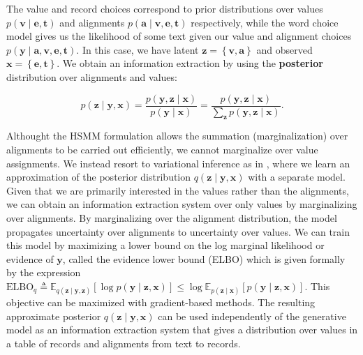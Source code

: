 \documentclass[11pt]{article}
\newcommand\set[1]{\left\{#1\right\}}
\newcommand\Es[2]{\mathbb{E}_{#1}\left[#2\right]}
\newcommand{\ba}{\mathbf{a}}
\newcommand{\be}{\mathbf{e}}
\newcommand{\bt}{\mathbf{t}}
\newcommand{\bv}{\mathbf{v}}
\newcommand{\bx}{\mathbf{x}}
\newcommand{\by}{\mathbf{y}}
\newcommand{\bz}{\mathbf{z}}
\begin{document}
The value and record choices correspond to prior distributions over values $p(\bv\mid\be,\bt)$
and alignments $p(\ba\mid\bv,\be,\bt)$ respectively,
while the word choice model gives us the likelihood of some text given our value and alignment choices $p(\by\mid\ba,\bv,\be,\bt)$.
In this case, we have latent $\bz = \set{\bv,\ba}$ and observed $\bx = \set{\be,\bt}$.
We obtain an information extraction by using the 
\textbf{posterior} distribution over alignments and values:
\begin{linenomath*}
$$
p(\bz\mid\by,\bx)=\frac{p(\by,\bz\mid\bx)}{p(\by\mid\bx)}=\frac{p(\by,\bz\mid\bx)}{\sum_\bz p(\by,\bz\mid\bx)}.
$$
\end{linenomath*}
Althought the HSMM formulation allows the summation (marginalization) over alignments to be carried out efficiently,
we cannot marginalize over value assignments.
We instead resort to variational inference as in \citet{deng2018attn},
where we learn an approximation of the posterior distribution $q(\bz\mid\by,\bx)$
with a separate model.
Given that we are primarily interested in the values rather than the alignments,
we can obtain an information extraction system over only values by marginalizing over alignments.
By marginalizing over the alignment distribution, the model propagates uncertainty over alignments
to uncertainty over values.
We can train this model by maximizing a lower bound on the log marginal likelihood or evidence of $\by$,
called the evidence lower bound (ELBO) which is given formally by the expression
$\textrm{ELBO}_q \triangleq \Es{q(\bz\mid\by,\bz)}{\log p(\by\mid\bz,\bx)}\leq \log \Es{p(\bz\mid\bx)} {p(\by\mid\bz,\bx)}$.
This objective can be maximized with gradient-based methods.
The resulting approximate posterior $q(\bz\mid\by,\bx)$ can be used independently of the 
generative model as an information extraction system that gives a distribution over
values in a table of records and alignments from text to records.
\end{document}
